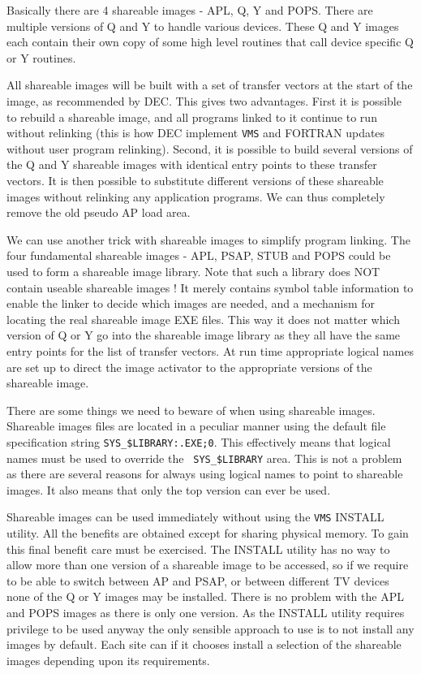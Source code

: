 Basically there are 4 shareable images - APL, Q, Y and POPS.  There are
multiple versions of Q and Y to handle various devices. These Q and Y
images each contain their own copy of some high level routines that call
device specific Q or Y routines.

All shareable images will be built with a set of transfer vectors at the
start of the image, as recommended by DEC. This gives two advantages.
First it is possible to rebuild a shareable image, and all programs
linked to it continue to run without relinking (this is how DEC
implement {\tt VMS\/} and FORTRAN updates without user program
relinking).  Second, it is possible to build several versions of the Q
and Y shareable images with identical entry points to these transfer
vectors.  It is then possible to substitute different versions of these
shareable images without relinking any application programs. We can thus
completely remove the old pseudo AP load area.

We can use another trick with shareable images to simplify program
linking. The four fundamental shareable images - APL, PSAP, STUB and
POPS could be used to form a shareable image library. Note that such a
library does NOT contain useable shareable images ! It merely contains
symbol table information to enable the linker to decide which images are
needed, and a mechanism for locating the real shareable image EXE files.
This way it does not matter which version of Q or Y go into the
shareable image library as they all have the same entry points for the
list of transfer vectors. At run time appropriate logical names are set
up to direct the image activator to the appropriate versions of the
shareable image.

There are some things we need to beware of when using shareable images.
Shareable images files are located in a peculiar manner using the
default file specification string {\tt SYS\_\$LIBRARY:.EXE;0}.  This
effectively means that logical names must be used to override the {\tt
SYS\_\$LIBRARY} area.  This is not a problem as there are several
reasons for always using logical names to point to shareable images. It
also means that only the top version can ever be used.

Shareable images can be used immediately without using the {\tt VMS\/}
INSTALL utility. All the benefits are obtained except for sharing
physical memory.  To gain this final benefit care must be exercised.
The INSTALL utility has no way to allow more than one version of a
shareable image to be accessed, so if we require to be able to switch
between AP and PSAP, or between different TV devices none of the Q or Y
images may be installed.  There is no problem with the APL and POPS
images as there is only one version.  As the INSTALL utility requires
privilege to be used anyway the only sensible approach to use is to not
install any images by default.  Each site can if it chooses install a
selection of the shareable images depending upon its requirements.

